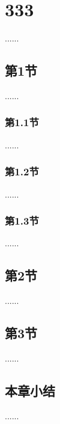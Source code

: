 
\chapter{333}

......

\section{第1节}

......

\subsection{第1.1节}

......

\subsection{第1.2节}

......

\subsection{第1.3节}

......

\section{第2节}

......

\section{第3节}

......

\section{本章小结}

......
